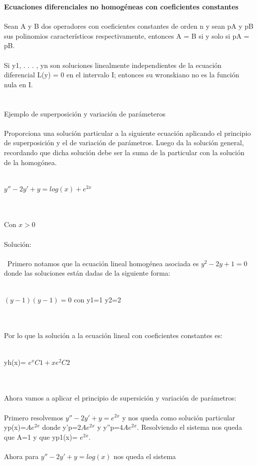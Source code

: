 \documentclass[a4paper,10pt]{article}
\begin{document}
\newpage
\textbf{Ecuaciones diferenciales no homogéneas con coeficientes constantes}\\\\
Sean A y B dos operadores con coeficientes constantes de orden n
y sean pA y pB sus polinomios característicos respectivamente,
entonces A = B si y solo si pA = pB.\\\\
Si y1, . . . , yn son soluciones linealmente independientes de la
ecuación diferencial L(y) = 0 en el intervalo I; entonces su
wronskiano no es la función nula en I.\\\\\\
Ejemplo de superposición y variación de parámeteros\\\\
Proporciona una solución particular a la siguiente ecuación
aplicando el principio de superposición y el de variación de
parámetros. Luego da la solución general, recordando que dicha
solución debe ser la suma de la particular con la solución de la
homogónea.\\\\
\centerline{$y'' - 2y' + y = log(x) + e^{2x}$}\\\\
Con $x>0$\\\\
Solución:\\\\\
Primero notamos que la ecuación lineal homogénea asociada es $y^2  - 2 y + 1 =0 $ donde las soluciones están dadas de la siguiente forma:\\\\
\centerline{$(y-1)(y-1)= 0 $ con y1=1 y2=2}\\\\
Por lo que la solución a la ecuación lineal con coeficientes constantes es:\\\\
\centerline{yh(x)= $ e^x C1 + xe^2 C2$}\\\\
Ahora vamos a aplicar el principio de supersición y variación de parámetros:\\\\
Primero resolvemos $y'' - 2y' + y =  e^{2x}$ y nos queda como solución particular yp(x)=$Ae^{2x}$ donde y'p=$2Ae^{2x}$ y y''p=$4Ae^{2x}$. Resolviendo el sistema nos queda que A=1 y que yp1(x)= $e^{2x}$.\\\\ 
Ahora para $y'' - 2y' + y =  log(x)$ nos queda el sistema\\\\
\end{document}

